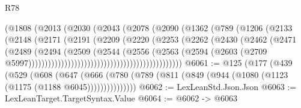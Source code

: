 \begin{lexlean}{R78}
\begin{coremodule}
                                        (@1808
                                          (@2013
                                            (@2030
                                              (@2043
                                                (@2078
                                                  (@2090
                                                    (@1362
                                                      (@789
                                                        (@1206
                                                          (@2133
                                                            (@2148
                                                              (@2171
                                                                (@2191
                                                                  (@2209
                                                                    (@2220
                                                                      (@2253
                                                                        (@2262
                                                                          (@2430
                                                                            (@2462
                                                                              (@2471
                                                                                (@2489
                                                                                  (@2494
                                                                                    (@2509
                                                                                      (@2544
                                                                                        (@2556
                                                                                          (@2563
                                                                                            (@2594
                                                                                              (@2603
                                                                                                (@2709
                                                                                                  @5997)))))))))))))))))))))))))))))))))))))))))))))))
@6061 := @125
    (@177
      (@439
        (@529
          (@608
            (@647
              (@666 (@780 (@789 (@811 (@849 (@944 (@1080 (@1123 (@1175 (@1188 @6045)))))))))))))))
@6062 := LexLeanStd.Json.Json
@6063 := LexLeanTarget.TargetSyntax.Value
@6064 := @6062 -> @6063

\end{coremodule}
\end{lexlean}
